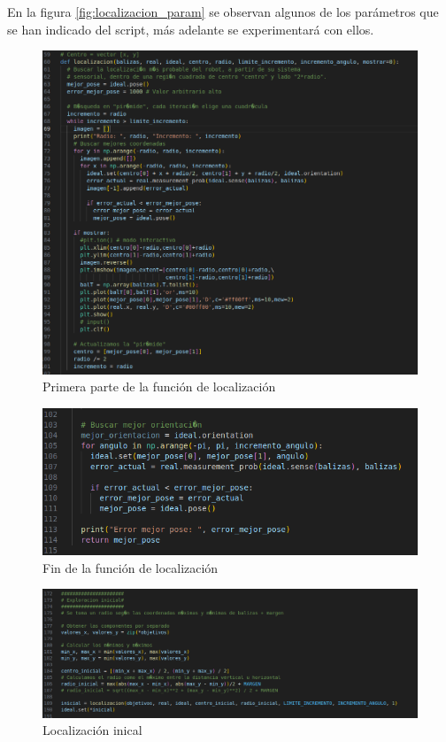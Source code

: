 En la figura \ref{fig:localizacion_param} se observan algunos de los parámetros que se han indicado del script, más adelante se experimentará con ellos. 

\begin{figure}[htb]
  \centering
  \includegraphics[width=1\linewidth]{images/localizacion1.png}
  \caption{Primera parte de la función de localización}
  \label{fig:localizacion_fun1}
\end{figure}
\begin{figure}[htb]
  \centering
  \includegraphics[width=.8\linewidth]{images/localizacion2.png}
  \caption{Fin de la función de localización}
  \label{fig:localizacion_fun2}
\end{figure}
\begin{figure}[htb]
  \centering
  \includegraphics[width=1\linewidth]{images/localizacion5.png}
  \caption{Localización inical}
  \label{fig:localizacion_inicial}
\end{figure}
